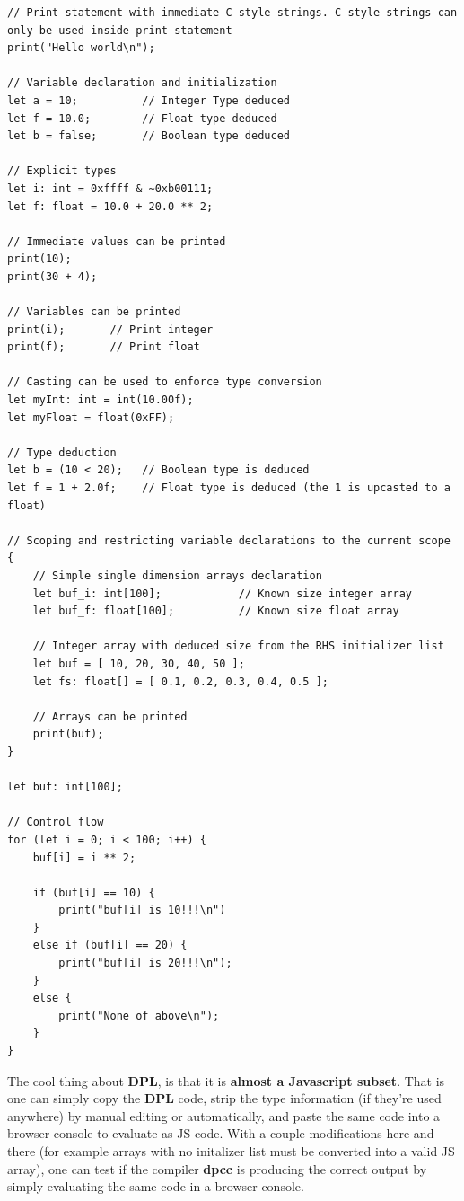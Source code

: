 \documentclass[a4paper]{article}
\begin{document}
\begin{lstlisting}[language=DPL]
// Print statement with immediate C-style strings. C-style strings can only be used inside print statement
print("Hello world\n");

// Variable declaration and initialization
let a = 10;          // Integer Type deduced
let f = 10.0;        // Float type deduced
let b = false;       // Boolean type deduced

// Explicit types
let i: int = 0xffff & ~0xb00111;
let f: float = 10.0 + 20.0 ** 2;

// Immediate values can be printed
print(10);
print(30 + 4);

// Variables can be printed
print(i);       // Print integer
print(f);       // Print float

// Casting can be used to enforce type conversion
let myInt: int = int(10.00f);
let myFloat = float(0xFF);

// Type deduction
let b = (10 < 20);   // Boolean type is deduced
let f = 1 + 2.0f;    // Float type is deduced (the 1 is upcasted to a float)

// Scoping and restricting variable declarations to the current scope
{
    // Simple single dimension arrays declaration
    let buf_i: int[100];            // Known size integer array
    let buf_f: float[100];          // Known size float array

    // Integer array with deduced size from the RHS initializer list
    let buf = [ 10, 20, 30, 40, 50 ];
    let fs: float[] = [ 0.1, 0.2, 0.3, 0.4, 0.5 ];

    // Arrays can be printed
    print(buf);
}

let buf: int[100];

// Control flow
for (let i = 0; i < 100; i++) {
    buf[i] = i ** 2;

    if (buf[i] == 10) {
        print("buf[i] is 10!!!\n")
    }
    else if (buf[i] == 20) {
        print("buf[i] is 20!!!\n");
    }
    else {
        print("None of above\n");
    }
}
\end{lstlisting}

The cool thing about \textbf{DPL}, is that it is \textbf{almost a Javascript subset}.
That is one can simply copy the \textbf{DPL} code, strip the type information (if they're used
anywhere) by manual editing or automatically, and paste the same code into a browser console to evaluate as JS code.
With a couple modifications here and there (for example arrays with no initalizer list must be converted into a valid
JS array), one can
test if the compiler \textbf{dpcc} is producing the correct output by simply
evaluating the same code in a browser console.
\end{document}
